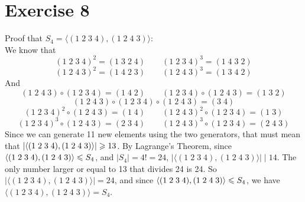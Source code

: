 \documentclass[12pt]{article}
\begin{document}
    \section*{Exercise 8}
    Proof that $S_4 = \langle (1\;2\;3\;4), (1\;2\;4\;3) \rangle$: \\
    We know that 
    \[ (1\;2\;3\;4)^2 = (1\;3\;2\;4) \qquad
    (1\;2\;3\;4)^3 = (1\;4\;3\;2) \]
    \[ (1\;2\;4\;3)^2 = (1\;4\;2\;3) \qquad
    (1\;2\;4\;3)^3 = (1\;3\;4\;2) \]
    And
    \[ (1\;2\;4\;3) \circ (1\;2\;3\;4) = (1\;4\;2) \qquad
    (1\;2\;3\;4) \circ (1\;2\;4\;3) = (1\;3\;2) \]
    \[ (1\;2\;4\;3) \circ (1\;2\;3\;4) \circ (1\;2\;4\;3) = (3\;4) \]
    \[ (1\;2\;3\;4)^2 \circ (1\;2\;4\;3) = (1\;4) \qquad
    (1\;2\;4\;3)^2 \circ (1\;2\;3\;4) = (1\;3) \]
    \[ (1\;2\;3\;4)^3 \circ (1\;2\;4\;3) = (2\;3\;4) \qquad
    (1\;2\;4\;3)^3 \circ (1\;2\;3\;4) = (2\;4\;3) \]
    Since we can generate 11 new elements using the two generators,
    that must mean that
    $|\langle (1\;2\;3\;4), (1\;2\;4\;3) \rangle| \geqslant 13$.
    By Lagrange's Theorem,
    since $\langle (1\;2\;3\;4), (1\;2\;4\;3) \rangle \leqslant S_4$,
    and $|S_4| = 4! = 24$,
    $|\langle (1\;2\;3\;4), (1\;2\;4\;3) \rangle| \mid 14$.
    The only number larger or equal to 13 that divides 24 is 24.
    So $|\langle (1\;2\;3\;4), (1\;2\;4\;3) \rangle| = 24$,
    and since $\langle (1\;2\;3\;4), (1\;2\;4\;3) \rangle \leqslant S_4$,
    we have $\langle (1\;2\;3\;4), (1\;2\;4\;3) \rangle = S_4$.

    
\end{document}
